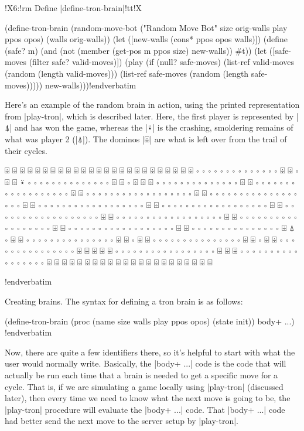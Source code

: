 \Y\B \verbatim
!X6:!rm Define |define-tron-brain|!tt!X

(define-tron-brain (random-move-bot 
                     ("Random Move Bot" size orig-walls play ppos opos) 
                     (walls orig-walls))
  (let ([new-walls (cons* ppos opos walls)])
    (define (safe? m) 
      (and (not (member (get-pos m ppos size) new-walls)) #t))
    (let ([safe-moves (filter safe? valid-moves)])
      (play 
        (if (null? safe-moves)
            (list-ref valid-moves (random (length valid-moves)))
            (list-ref safe-moves (random (length safe-moves)))))
      new-walls)))!endverbatim  \par
\fi

Here's an example of the random brain in action, using the 
printed representation from |play-tron|, which is described 
later. Here, the first player is represented by |⍋| and has 
won the game, whereas the |⍣| is the crashing, smoldering 
remains of what was player 2 (|⍋|). The dominos |⌹| are what 
is left over from the trail of their cycles.


\medskip\verbatim

		⌹ ⌹ ⌹ ⌹ ⌹ ⌹ ⌹ ⌹ ⌹ ⌹ ⌹ ⌹ ⌹ ⌹ ⌹ ⌹ ⌹ ⌹ ⌹ ⌹ 
		⌹ ⌹ ⌹ ⌹ ⌹ ∘ ∘ ∘ ∘ ∘ ∘ ∘ ∘ ∘ ∘ ∘ ∘ ∘ ∘ ⌹ 
		⌹ ∘ ⌹ ⌹ ⍣ ∘ ∘ ∘ ∘ ∘ ∘ ∘ ∘ ∘ ∘ ∘ ∘ ∘ ∘ ⌹ 
		⌹ ∘ ⌹ ⌹ ⌹ ∘ ∘ ∘ ∘ ∘ ∘ ∘ ∘ ∘ ∘ ∘ ∘ ∘ ∘ ⌹ 
		⌹ ∘ ∘ ∘ ∘ ∘ ∘ ∘ ∘ ∘ ∘ ∘ ∘ ∘ ∘ ∘ ∘ ∘ ∘ ⌹ 
		⌹ ∘ ∘ ∘ ∘ ∘ ∘ ∘ ∘ ∘ ∘ ∘ ∘ ∘ ∘ ∘ ∘ ∘ ∘ ⌹ 
		⌹ ∘ ∘ ∘ ∘ ∘ ∘ ∘ ∘ ∘ ∘ ∘ ∘ ∘ ∘ ∘ ∘ ∘ ∘ ⌹ 
		⌹ ∘ ∘ ∘ ∘ ∘ ∘ ∘ ∘ ∘ ∘ ∘ ∘ ∘ ∘ ∘ ∘ ∘ ∘ ⌹ 
		⌹ ∘ ∘ ∘ ∘ ∘ ∘ ∘ ∘ ∘ ∘ ∘ ∘ ∘ ∘ ∘ ∘ ∘ ∘ ⌹ 
		⌹ ∘ ∘ ∘ ∘ ∘ ∘ ∘ ∘ ∘ ∘ ∘ ∘ ∘ ∘ ∘ ∘ ∘ ∘ ⌹ 
		⌹ ∘ ∘ ∘ ∘ ∘ ∘ ∘ ∘ ∘ ∘ ∘ ∘ ∘ ∘ ∘ ∘ ∘ ∘ ⌹ 
		⌹ ∘ ∘ ∘ ∘ ∘ ∘ ∘ ∘ ∘ ∘ ∘ ∘ ∘ ∘ ∘ ∘ ∘ ∘ ⌹ 
		⌹ ∘ ∘ ∘ ∘ ∘ ∘ ∘ ∘ ∘ ∘ ∘ ∘ ∘ ∘ ∘ ∘ ∘ ∘ ⌹ 
		⌹ ∘ ∘ ∘ ∘ ∘ ∘ ∘ ∘ ∘ ∘ ∘ ∘ ∘ ∘ ∘ ⌹ ⍋ ∘ ⌹ 
		⌹ ∘ ∘ ∘ ∘ ∘ ∘ ∘ ∘ ∘ ∘ ∘ ∘ ∘ ∘ ∘ ⌹ ⌹ ∘ ⌹ 
		⌹ ∘ ∘ ∘ ∘ ∘ ∘ ∘ ∘ ∘ ∘ ∘ ∘ ∘ ∘ ∘ ⌹ ⌹ ∘ ⌹ 
		⌹ ∘ ∘ ∘ ∘ ∘ ∘ ∘ ∘ ∘ ∘ ∘ ∘ ∘ ∘ ∘ ⌹ ⌹ ⌹ ⌹ 
		⌹ ∘ ∘ ∘ ∘ ∘ ∘ ∘ ∘ ∘ ∘ ∘ ∘ ∘ ∘ ∘ ∘ ∘ ⌹ ⌹ 
		⌹ ∘ ∘ ∘ ∘ ∘ ∘ ∘ ∘ ∘ ∘ ∘ ∘ ∘ ∘ ∘ ∘ ∘ ⌹ ⌹ 
		⌹ ⌹ ⌹ ⌹ ⌹ ⌹ ⌹ ⌹ ⌹ ⌹ ⌹ ⌹ ⌹ ⌹ ⌹ ⌹ ⌹ ⌹ ⌹ ⌹ 

!endverbatim


\fi

 Creating brains. The syntax for defining a tron brain is as 
follows:

\medskip\verbatim
(define-tron-brain (proc (name size walls play ppos opos) 
                         (state init))
  body+ ...)
!endverbatim\medskip

\noindent Now, there are quite a few identifiers there, so it's helpful 
to start with what the user would normally write. Basically, the 
|body+ ...| code is the code that will actually be run each time that 
a brain is needed to get a specific move for a cycle. That is, if we are 
simulating a game locally using |play-tron| (discussed later), then 
every time we need to know what the next move is going to be, the 
|play-tron| procedure will evaluate the |body+ ...| code. That |body+ ...|
code had better send the next move to the server setup by |play-tron|.


